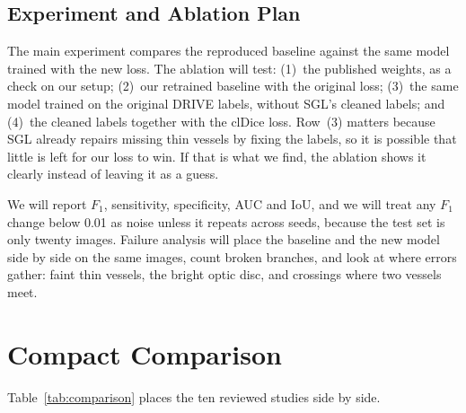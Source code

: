 \documentclass[conference]{IEEEtran}
\begin{document}
\subsection{Experiment and Ablation Plan}

The main experiment compares the reproduced baseline against the same model
trained with the new loss. The ablation will test: (1)~the published weights,
as a check on our setup; (2)~our retrained baseline with the original loss;
(3)~the same model trained on the original DRIVE labels, without SGL's cleaned
labels; and (4)~the cleaned labels together with the clDice loss. Row~(3)
matters because SGL already repairs missing thin vessels by fixing the labels,
so it is possible that little is left for our loss to win. If that is what we
find, the ablation shows it clearly instead of leaving it as a guess.

We will report $F_1$, sensitivity, specificity, AUC and IoU, and we will treat
any $F_1$ change below 0.01 as noise unless it repeats across seeds, because
the test set is only twenty images. Failure analysis will place the baseline
and the new model side by side on the same images, count broken branches, and
look at where errors gather: faint thin vessels, the bright optic disc, and
crossings where two vessels meet.

\section{Compact Comparison}

Table~\ref{tab:comparison} places the ten reviewed studies side by side.
\end{document}
